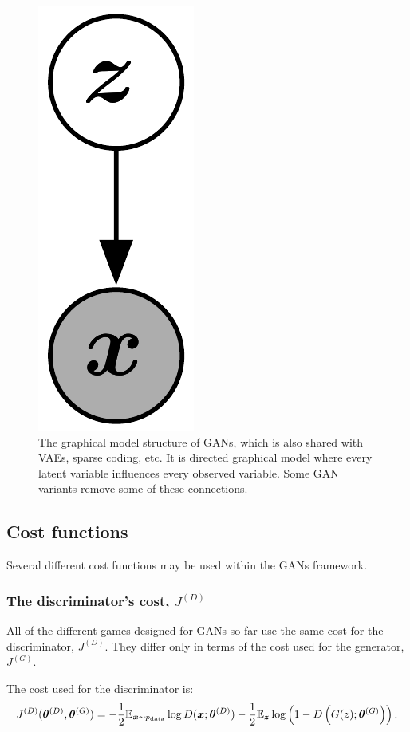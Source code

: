 \begin{figure}
  \centering
  \includegraphics{graph}
  \caption{The graphical model structure of GANs, which is also shared with
    VAEs, sparse coding, etc.
    It is directed graphical model where every latent variable influences
    every observed variable.
    Some GAN variants remove some of these connections.
  }
  \label{fig:graph}
\end{figure}

\subsection{Cost functions}

Several different cost functions may be used within the GANs framework.

\subsubsection{The discriminator's cost, $J^{(D)}$}

All of the different games designed for GANs so far use the same cost for the
discriminator, $J^{(D)}$. They differ only in terms of the cost used for the
generator, $J^{(G)}$.

The cost used for the discriminator is:
\begin{equation}
  J^{(D)}({\bm{\theta}}^{(D)}, {\bm{\theta}}^{(G)}) = -\frac{1}{2} \mathbb{E}_{{\bm{x}} \sim p_{\rm{data}}} \log D({\bm{x}}; {\bm{\theta}}^{(D)}) - \frac{1}{2} \mathbb{E}_{{\bm{z}}} \log \left(1 - D\left( G(z); {\bm{\theta}}^{(G)} \right) \right).
  \label{eq:discriminator_cost}
\end{equation}

